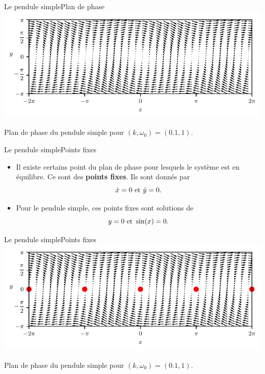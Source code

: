 \documentclass[usenames,dvipsnames,svgnames,10pt,aspectratio=169]{beamer}
\begin{document}
\begin{frame}[t, c]{Le pendule simple}{Plan de phase}
	\centering
	\includegraphics[width=.75\textwidth]{pendulum_phase_plane}

	Plan de phase du pendule simple pour $(k, \omega_0) = (0.1, 1)$.
	\vspace{1cm}
\end{frame}

\begin{frame}[t, c]{Le pendule simple}{Points fixes}
	\begin{itemize}
		\item Il existe certains point du plan de phase pour lesquels le système est en équilibre. Ce sont des \alert{\textbf{points fixes}}. Ils sont donnés par
		\begin{equation}
			\dot{x} = 0 \text{ et } \dot{y} = 0.
			\notag
		\end{equation}

		\bigskip

		\item Pour le pendule simple, ces points fixes sont solutions de
		\begin{equation}
			y = 0 \text{ et } \sin(x) = 0.
			\notag
		\end{equation}
	\end{itemize}

	\vspace{1cm}
\end{frame}

\begin{frame}[t, c]{Le pendule simple}{Points fixes}
	\centering
	\includegraphics[width=.75\textwidth]{pendulum_fixed_points}

	Plan de phase du pendule simple pour $(k, \omega_0) = (0.1, 1)$.
	\vspace{1cm}
\end{frame}
\end{document}
